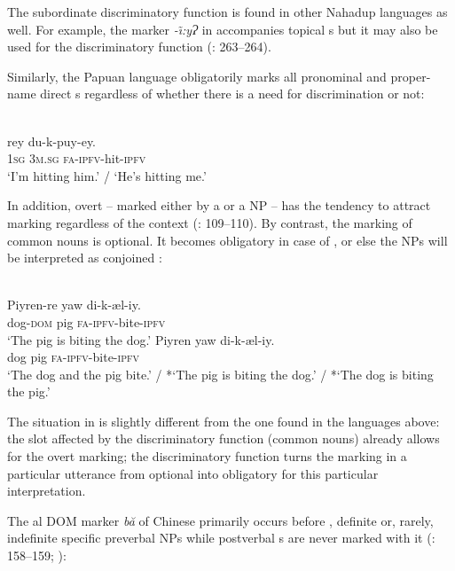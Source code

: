 \documentclass[output=paper]{langsci/langscibook}
\begin{document}
The subordinate discriminatory function is found in other Nahadup languages as well. For example, the  marker \textit{{}-\~\i:yɁ} in  accompanies topical s but it may also be used for the discriminatory function (\citealt{MartinsMartins1999}: 263–264). 

Similarly, the Papuan language  obligatorily marks all pronominal and proper-name direct s regardless of whether there is a need for discrimination or not:

\ea\label{ex:serzant:18}
\\
\gll *   rey   du-k-puy-ey.\\
     \textsc{1sg}   \textsc{3m.sg}  \textsc{fa-ipfv}{}-hit-\textsc{ipfv}\\
 ‘I’m hitting him.’ / ‘He’s hitting me.’
\z

In addition, overt  – marked either by a  or a  NP – has the tendency to attract  marking regardless of the context (\citealt{Feldman1986}: 109\-–110). By contrast, the marking of common nouns is optional. It becomes obligatory in case of , or else the NPs will be interpreted as conjoined \citep[110]{Feldman1986}:

\ea\label{ex:serzant:19}
\\
\ea
\gll Piyren-re  yaw  di-k-æl-iy.\\
     dog-\textsc{dom}  pig  \textsc{fa-ipfv}{}-bite-\textsc{ipfv}\\
\glt ‘The pig is biting the dog.’
\ex
\gll Piyren  yaw  di-k-æl-iy.\\
     dog  pig  \textsc{fa-ipfv}{}-bite-\textsc{ipfv}\\
\glt ‘The dog and the pig bite.’ / *‘The pig is biting the dog.’ / *‘The dog is biting the pig.’
\z
\z

The situation in  is slightly different from the one found in the languages above: the slot affected by the discriminatory function (common nouns) already allows for the overt marking; the discriminatory function turns the marking in a particular utterance from optional into obligatory for this particular interpretation.

The al DOM marker \textit{bă} of Chinese primarily occurs before \animate{}, definite or, rarely, indefinite specific preverbal  NPs while postverbal s are never marked with it (\citealt{LiThompson1981,Bisang1992}: 158–159; \citealt{YangvanBergen2007}):
\end{document}
